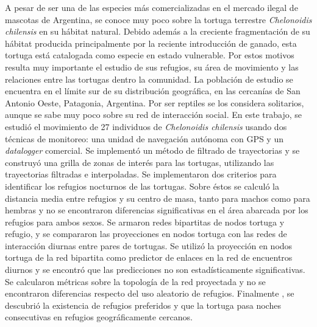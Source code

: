 \begin{resumen}%
    A pesar de ser una de las especies más comercializadas en el mercado ilegal de mascotas de Argentina, se conoce muy poco sobre la tortuga 
    terrestre \textit{Chelonoidis chilensis} en su hábitat natural. Debido 
    además a la creciente fragmentación de su hábitat producida principalmente 
    por la reciente introducción de ganado, esta tortuga está catalogada como 
    especie en estado 
    vulnerable. Por estos motivos resulta muy importante el 
    estudio de sus refugios, su área de movimiento y las relaciones entre 
    las tortugas dentro la comunidad. La población de estudio se encuentra 
    en el límite sur de su distribución geográfica, en las cercanías de
    San Antonio Oeste, Patagonia, Argentina. Por ser reptiles se los
    considera 
    solitarios, aunque se sabe muy poco sobre su red de interacción social. 
    En este trabajo, se estudió el movimiento de 27 individuos 
    de \textit{Chelonoidis chilensis} usando dos técnicas de monitoreo: 
    una unidad de navegación  autónoma con GPS y un \textit{datalogger} comercial. 
    Se implementó un método de filtrado de trayectorias y se construyó una 
    grilla de zonas de interés para las tortugas, utilizando las 
    trayectorias filtradas e interpoladas. Se implementaron dos criterios 
    para identificar los refugios nocturnos de las tortugas. Sobre éstos 
    se calculó la distancia media entre refugios y su centro de masa, 
    tanto para machos como para hembras y no se 
    encontraron 
    diferencias significativas en el área abarcada por los refugios para 
    ambos sexos. Se armaron redes bipartitas de nodos 
    tortuga y refugio, y se compararon las proyecciones en nodos tortuga 
    con las redes de interacción diurnas entre pares de tortugas. Se utilizó 
    la proyección en nodos tortuga de 
    la red bipartita como predictor de enlaces en la red de encuentros diurnos
    y se encontró que las predicciones no son estadísticamente significativas. 
    Se calcularon métricas sobre la topología de la red proyectada y no se 
    encontraron diferencias respecto del uso aleatorio de refugios. Finalmente
    , se descubrió la existencia de refugios preferidos y que 
    la tortuga pasa noches consecutivas en refugios geográficamente cercanos.
\end{resumen}

